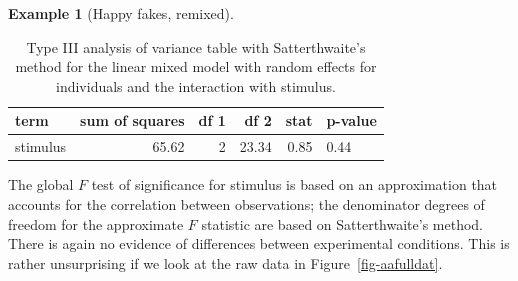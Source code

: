 \documentclass[
  11pt,
  letterpaper,
]{scrbook}
\theoremstyle{definition}
\theoremstyle{definition}
\newtheorem{example}{Example}[chapter]
\theoremstyle{remark}
\begin{document}
\begin{example}[Happy fakes,
remixed]
\begin{longtable}[]{@{}lrrrrl@{}}

\caption{\label{tbl-happyfake-rep-anova}Type III analysis of variance
table with Satterthwaite's method for the linear mixed model with random
effects for individuals and the interaction with stimulus.}

\tabularnewline

\toprule\noalign{}
term & sum of squares & df 1 & df 2 & stat & p-value \\
\midrule\noalign{}
\endhead
\bottomrule\noalign{}
\endlastfoot
stimulus & 65.62 & 2 & 23.34 & 0.85 & 0.44 \\

\end{longtable}

The global \(F\) test of significance for stimulus is based on an
approximation that accounts for the correlation between observations;
the denominator degrees of freedom for the approximate \(F\) statistic
are based on Satterthwaite's method. There is again no evidence of
differences between experimental conditions. This is rather unsurprising
if we look at the raw data in Figure~\ref{fig-aafulldat}.

\end{example}
\end{document}
